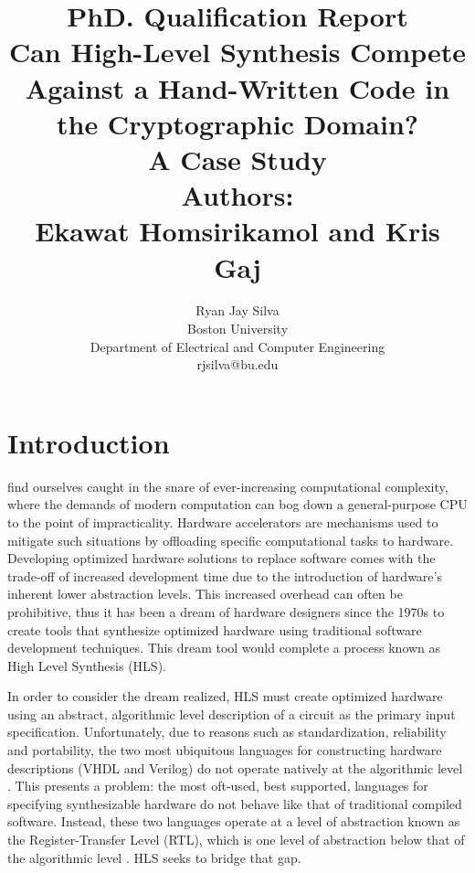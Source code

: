 \documentclass[12pt,journal,compsoc,onecolumn]{IEEEtran}
\begin{document}
\title{PhD. Qualification Report \\ \LARGE{\textbf{Can High-Level Synthesis Compete Against a Hand-Written Code in the Cryptographic Domain? \\ A Case Study \cite{sel}}} \\ Authors: \\ Ekawat Homsirikamol and Kris Gaj}

\author{Ryan Jay Silva \\ Boston University \\ Department of Electrical and Computer Engineering \\ rjsilva@bu.edu
}

\maketitle
\IEEEdisplaynontitleabstractindextext
\IEEEpeerreviewmaketitle


\section{Introduction}

 find ourselves caught in the snare of ever-increasing computational complexity, where the demands of modern computation can bog down a general-purpose CPU to the point of impracticality\cite{skalicky}. Hardware accelerators are mechanisms used to mitigate such situations by offloading specific computational tasks to hardware. Developing optimized hardware solutions to replace software comes with the trade-off of increased development time due to the introduction of hardware's inherent lower abstraction levels. This increased overhead can often be prohibitive, thus it has been a dream of hardware designers since the 1970s to create tools that synthesize optimized hardware using traditional software development techniques\cite{1}. This dream tool would complete a process known as High Level Synthesis (HLS).

In order to consider the dream realized, HLS must create optimized hardware using an abstract, algorithmic level description of a circuit as the primary input specification\cite{mcfarland}. Unfortunately, due to reasons such as standardization\cite{ieee}, reliability\cite{tosun} and portability\cite{churtl}, the two most ubiquitous languages for constructing hardware descriptions (VHDL and Verilog) do not operate natively at the algorithmic level \cite{Harris+Harris}. This presents a problem: the most oft-used, best supported, languages for specifying synthesizable hardware do not behave like that of traditional compiled software. Instead, these two languages operate at a level of abstraction known as the Register-Transfer Level (RTL), which is one level of abstraction below that of the algorithmic level \cite{vahid}. HLS seeks to bridge that gap.
\end{document}
